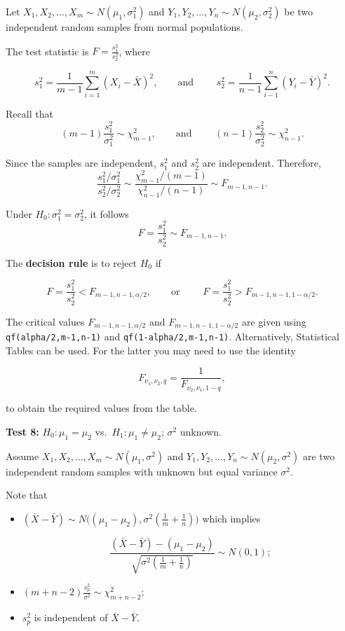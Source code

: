 \documentclass[
]{book}
\providecommand{\tightlist}{%
  \setlength{\itemsep}{0pt}\setlength{\parskip}{0pt}}
\begin{document}
Let \(X_1,X_2,\dots,X_m \sim N(\mu_1, \sigma^2_1)\) and \(Y_1,Y_2,\dots,Y_n \sim N(\mu_2, \sigma^2_2)\)
be two independent random samples from normal populations.

The test statistic is \(F=\frac{s_1^2}{s_2^2}\), where

\[ s_1^2 = \frac{1}{m-1} \sum\limits_{i=1}^m (X_i - \bar{X})^2, \qquad \text{and } \qquad s_2^2 = \frac{1}{n-1} \sum\limits_{i-1}^n (Y_i - \bar{Y})^2.\]

Recall that\\

\[ (m-1) \frac{s_1^2}{\sigma_1^2} \sim \chi_{m-1}^2, \qquad \text{and } \qquad (n-1) \frac{s_2^2}{\sigma_2^2} \sim \chi_{n-1}^2.\]

Since the samples are independent, \(s_1^2\) and \(s_2^2\) are independent. Therefore,\\

\[\frac{s_1^2/\sigma_1^2}{s_2^2/\sigma_2^2} \sim \frac{\chi_{m-1}^2/(m-1) }{ \chi_{n-1}^2/(n-1)} \sim F_{m-1,n-1}. \]

Under \(H_0 : \sigma_1^2 = \sigma_2^2\), it follows\\

\[F= \frac{s_1^2}{s_2^2} \sim F_{m-1,n-1}.\]

The {\textbf{decision rule}} is to reject \(H_0\) if

\[F = \frac{s_1^2}{s_2^2} < F_{m-1,n-1,\alpha/2}, \qquad \text{or } \qquad F = \frac{s_1^2}{s_2^2} > F_{m-1,n-1,1-\alpha/2}.\]

The critical values \(F_{m-1,n-1,\alpha/2}\) and \(F_{m-1,n-1,1-\alpha/2}\) are given using \texttt{qf(alpha/2,m-1,n-1)} and \texttt{qf(1-alpha/2,m-1,n-1)}. Alternatively, Statistical Tables can be used. For the latter you may need to use the identity

\[ F_{\nu_1,\nu_2,q} = \frac{1}{F_{\nu_2,\nu_1,1-q}},\]

to obtain the required values from the table.

\leavevmode{}%
{\textbf{Test 8:}} \(H_0: \mu_1 = \mu_2\) vs.~\(H_1: \mu_1 \neq \mu_2\); \(\sigma^2\) unknown.

Assume \(X_1,X_2,\dots,X_m \sim N(\mu_1, \sigma^2)\) and \(Y_1,Y_2,\dots,Y_n \sim N(\mu_2, \sigma^2)\) are two independent random samples with unknown but equal variance \(\sigma^2\).

Note that

\begin{itemize}
\tightlist
\item
  \((\bar{X} - \bar{Y}) \sim N \Big( (\mu_1 -\mu_2), \sigma^2 \left( \frac{1}{m} + \frac{1}{n} \right) \Big)\) which implies

  \[\frac{(\bar{X} - \bar{Y}) - (\mu_1 - \mu_2) }{ \sqrt{ \sigma^2 \left( \frac{1}{m} + \frac{1}{n} \right) }} \sim N(0,1);\]
\item
  \((m+n-2) \frac{s_p^2}{\sigma^2} \sim \chi_{m+n-2}^2\);\\
\item
  \(s_p^2\) is independent of \(\bar{X} - \bar{Y}\).
\end{itemize}
\end{document}
